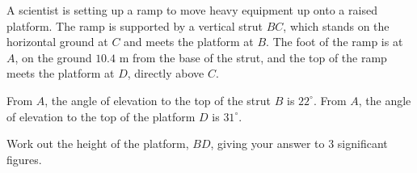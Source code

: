 \begin{question}
\noindent A scientist is setting up a ramp to move heavy equipment up onto a raised platform. The ramp is supported by a vertical strut $BC$, which stands on the horizontal ground at $C$ and meets the platform at $B$. The foot of the ramp is at $A$, on the ground $10.4$ m from the base of the strut, and the top of the ramp meets the platform at $D$, directly above $C$.

From $A$, the angle of elevation to the top of the strut $B$ is $22^{\circ}$. From $A$, the angle of elevation to the top of the platform $D$ is $31^{\circ}$.

\begin{center}
\end{center}

\noindent Work out the height of the platform, $BD$, giving your answer to 3 significant figures.

\vspace{5cm}

\begin{flushright}
\end{flushright}
\end{question}

